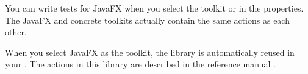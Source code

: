 You can write tests for JavaFX \gdauts{} when you select the toolkit  or  in the \gdproject{} properties. The JavaFX and concrete toolkits actually contain the same actions as each other. 

When you select JavaFX as the \gdproject{} toolkit, the library \gdproject{}  is automatically reused in your \gdproject{}. The actions in this library are described in the reference manual .
